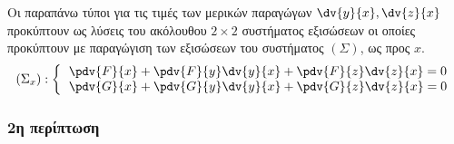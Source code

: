       \begin{rem}
        Οι παραπάνω τύποι για τις τιμές των μερικών παραγώγων $ \dv{y}{x}, \dv{z}{x}$ 
        προκύπτουν ως λύσεις του ακόλουθου $ 2 \times 2 $ συστήματος εξισώσεων οι οποίες 
        προκύπτουν με παραγώγιση των εξισώσεων του συστήματος $ (\Sigma) $, ως προς $x$.
        \renewcommand{\arraystretch}{2}
        \[
          \begin{aligned}
            (\Sigma_x): \left\{\begin{tabular}{l}
                $\pdv{F}{x} + \pdv{F}{y}\dv{y}{x} + \pdv{F}{z}\dv{z}{x} = 0$ \\
                $\pdv{G}{x} + \pdv{G}{y}\dv{y}{x} + \pdv{G}{z}\dv{z}{x} = 0$
              \end{tabular}
            \right.
          \end{aligned}
        \]
      \end{rem}

      \subsubsection{2η περίπτωση}

